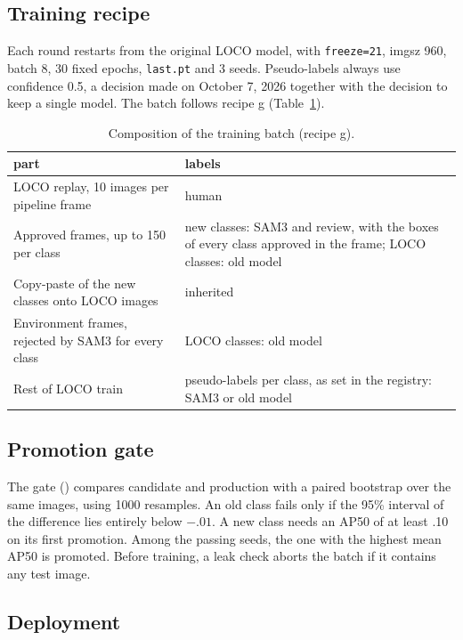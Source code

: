 \documentclass[11pt,a4paper]{article}
\begin{document}
\subsection{Training recipe}

Each round restarts from the original LOCO model, with \texttt{freeze=21}, imgsz
960, batch 8, 30 fixed epochs, \texttt{last.pt} and 3 seeds. Pseudo-labels always
use confidence 0.5, a decision made on October 7, 2026 together with the decision
to keep a single model. The batch follows recipe g (Table~\ref{tab:recipe}).

\begin{table}[H]
\centering\small
\caption{Composition of the training batch (recipe g).}
\label{tab:recipe}
\begin{tabular}{p{7.2cm}p{7.6cm}}
\toprule
part & labels \\
\midrule
LOCO replay, 10 images per pipeline frame & human \\
Approved frames, up to 150 per class & new classes: SAM3 and review, with the boxes of every class approved in the frame; LOCO classes: old model \\
Copy-paste of the new classes onto LOCO images & inherited \\
Environment frames, rejected by SAM3 for every class & LOCO classes: old model \\
Rest of LOCO train & pseudo-labels per class, as set in the registry: SAM3 or old model \\
\bottomrule
\end{tabular}
\end{table}

\subsection{Promotion gate}

The gate () compares candidate and production with a
paired bootstrap over the same images, using 1000 resamples. An old class fails
only if the 95\% interval of the difference lies entirely below $-.01$. A new
class needs an AP50 of at least .10 on its first promotion. Among the passing
seeds, the one with the highest mean AP50 is promoted. Before training, a leak
check aborts the batch if it contains any test image.

\subsection{Deployment}
\end{document}
